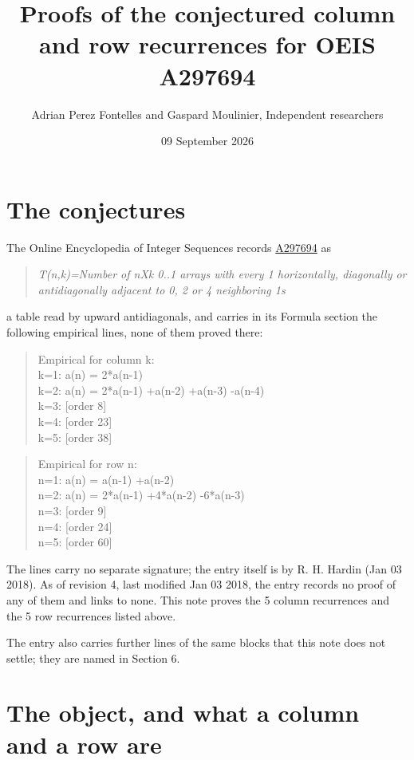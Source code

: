 \documentclass[11pt]{article}
\title{Proofs of the conjectured column and row recurrences for OEIS A297694}
\author{Adrian Perez Fontelles and Gaspard Moulinier, Independent researchers}
\date{09 September 2026}
\theoremstyle{definition}
\begin{document}
\maketitle
\section{The conjectures}

The Online Encyclopedia of Integer Sequences records \href{https://oeis.org/A297694}{A297694} as

\begin{quote}\itshape T(n,k)=Number of nXk 0..1 arrays with every 1 horizontally, diagonally or antidiagonally adjacent to 0, 2 or 4 neighboring 1s\end{quote}

a table read by upward antidiagonals, and carries in its Formula section the following empirical lines, none of them proved there:

\begin{quote}\ttfamily Empirical for column k:\\
k=1: a(n) = 2*a(n-1)\\k=2: a(n) = 2*a(n-1) +a(n-2) +a(n-3) -a(n-4)\\k=3: [order 8]\\k=4: [order 23]\\k=5: [order 38]\end{quote}

\begin{quote}\ttfamily Empirical for row n:\\
n=1: a(n) = a(n-1) +a(n-2)\\n=2: a(n) = 2*a(n-1) +4*a(n-2) -6*a(n-3)\\n=3: [order 9]\\n=4: [order 24]\\n=5: [order 60]\end{quote}

The lines carry no separate signature; the entry itself is by R. H. Hardin (Jan 03 2018). As of revision 4, last modified Jan 03 2018, the entry records no proof of any of them and links to none. This note proves the 5 column recurrences and the 5 row recurrences listed above.

The entry also carries further lines of the same blocks that this note does not settle; they are named in Section 6.

\section{The object, and what a column and a row are}
\end{document}
